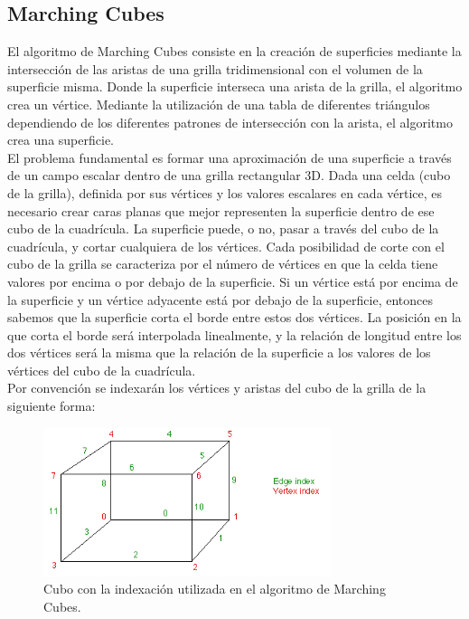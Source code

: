 \documentclass[12pt]{article}
\begin{document}
\subsection{Marching Cubes}
El algoritmo de Marching Cubes\cite{marching}\cite{marchingcubes} consiste en la creación de superficies mediante la intersección de las aristas de una grilla tridimensional con el volumen de la superficie misma. Donde la superficie interseca una arista de la grilla, el algoritmo crea un vértice. Mediante la utilización de una tabla de diferentes triángulos dependiendo de los diferentes patrones de intersección con la arista, el algoritmo crea una superficie.
\\El problema fundamental es formar una aproximación de una superficie a través de un campo escalar dentro de una grilla rectangular 3D. Dada una celda (cubo de la grilla), definida por sus vértices y los valores escalares en cada vértice, es necesario crear caras planas que mejor representen la superficie dentro de ese cubo de la cuadrícula. La superficie puede, o no, pasar a través del cubo de la cuadrícula, y cortar cualquiera de los vértices. Cada posibilidad de corte con el cubo de la grilla se caracteriza por el número de vértices en que la celda tiene valores por encima o por debajo de la superficie. Si un vértice está por encima de la superficie y un vértice adyacente está por debajo de la superficie, entonces sabemos que la superficie corta el borde entre estos dos vértices. La posición en la que corta el borde será interpolada linealmente, y la relación de longitud entre los dos vértices será la misma que la relación de la superficie a los valores de los vértices del cubo de la cuadrícula.
\\Por convención se indexarán los vértices y aristas del cubo de la grilla de la siguiente forma:
\begin{figure}[h!]
\includegraphics[width=0.75\textwidth,center]{marchingcubes1.png}
\caption{Cubo con la indexación utilizada en el algoritmo de Marching Cubes.}
\end{figure}
\end{document}
